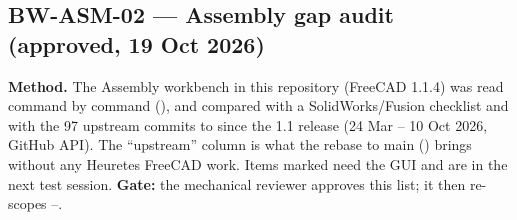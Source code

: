 \subsection{BW-ASM-02 --- Assembly gap audit (approved, 19 Oct 2026)}\label{sec:asm-audit}

\textbf{Method.} The Assembly workbench in this repository (FreeCAD 1.1.4) was read command by command
(), and compared with a SolidWorks/Fusion checklist and with the 97 upstream commits
to  since the 1.1 release (24 Mar -- 10 Oct 2026, GitHub API). The ``upstream'' column
is what the rebase to main () brings without any Heuretes FreeCAD work. Items marked \verify{} need the
GUI and are in the next test session. \textbf{Gate:} the mechanical reviewer approves this list; it then
re-scopes --.

